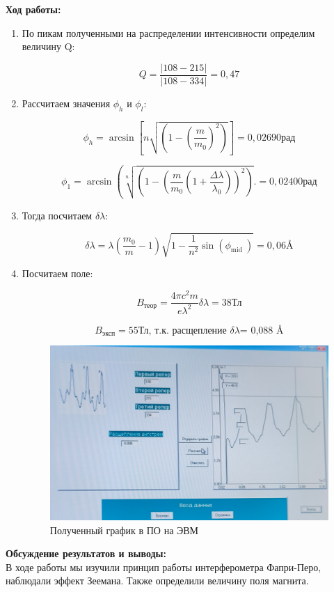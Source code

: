 \documentclass[a4paper, 12pt]{article}%
\begin{document}
	\newpage
	\textbf{Ход работы: }\\
	\begin{enumerate}
		\item По пикам полученными на распределении интенсивности определим величину Q:
		
		$$ Q = \frac{|108-215|}{|108-334|} = 0,47 $$
		
		\item Рассчитаем значения $\phi_h$ и $\phi_l$:
		
		$$ \phi_h=\arcsin \left[n \sqrt{\left(1-\left(\frac{m}{m_0}\right)^2\right)}\right] = 0,02690 \text{рад}$$
		
		$$ \phi_1=\arcsin \left(\sqrt[n]{\left(1-\left(\frac{m}{m_0}\left(1+\frac{\Delta \lambda}{\lambda_0}\right)\right)^2\right)} .\right. = 0,02400 \text{рад}$$ 
		
		\item Тогда посчитаем $\delta \lambda$:
		
		$$ \delta \lambda=\lambda\left(\frac{m_0}{m}-1\right) \sqrt{1-\frac{1}{n^2} \sin \left(\phi_{\text {mid }}\right)} = 0,06 \text{\AA} $$
		
		\item Посчитаем поле:
		
		$$ B_{\text{теор}} = \frac{4\pi c^2 m}{ e \lambda^2} \delta \lambda = 38 \text{Тл}$$
		
		$$ B_{\text{эксп}} = 55 \text{Тл, т.к. расщепление $\delta \lambda $= 0,088 \AA}$$
		
		
		\begin{figure}[h!]
			\centering
			\includegraphics[width=1\linewidth]{graph}
			\caption{Полученный график в ПО на ЭВМ}
		\end{figure}
		
		
		
		
	\end{enumerate}
	
	\textbf{Обсуждение результатов и выводы: }\\
	
	В ходе работы мы изучили принцип работы интерферометра Фапри-Перо, наблюдали эффект Зеемана. Также определили величину поля магнита.
	
	
	
	
	
	
	
	
\end{document}
